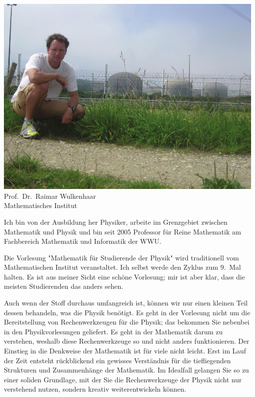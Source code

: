 \begin{multicols}{2}
\begin{center}
\includegraphics[width=0.9\columnwidth]{res/vorstellungsfotos/wulkenhaar.png}\\
Prof.\ Dr.\ Raimar Wulkenhaar\\
Mathematisches Institut
\end{center}

Ich bin von der Ausbildung her Physiker, arbeite im Grenzgebiet zwischen Mathematik und Physik und bin seit 2005 Professor für Reine Mathematik am Fachbereich Mathematik und Informatik der WWU.

Die Vorlesung "Mathematik für Studierende der Physik" wird traditionell vom Mathematischen Institut veranstaltet. Ich selbst werde den Zyklus zum 9.~Mal halten. Es ist aus meiner Sicht eine schöne Vorlesung; mir ist aber klar, dass die meisten Studierenden das anders sehen.

Auch wenn der Stoff durchaus umfangreich ist, können wir nur einen kleinen Teil dessen behandeln, was die Physik benötigt. Es geht in der Vorlesung nicht um die Bereitstellung von Rechenwerkzeugen für die Physik; das bekommen Sie nebenbei in den Physikvorlesungen geliefert. Es geht in der Mathematik darum zu verstehen, weshalb diese Rechenwerkzeuge so und nicht anders funktionieren. Der Einstieg in die Denkweise der Mathematik ist für viele nicht leicht. Erst im Lauf der Zeit entsteht rückblickend ein gewisses Verständnis für die tiefliegenden Strukturen und Zusammenhänge der Mathematik. Im Idealfall gelangen Sie so zu einer soliden Grundlage, mit der Sie die Rechenwerkzeuge der Physik nicht nur verstehend nutzen, sondern kreativ weiterentwickeln können.



\end{multicols}
